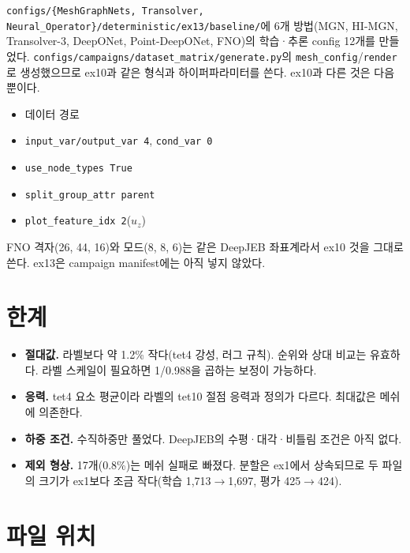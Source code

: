 \documentclass[11pt]{article}
\begin{document}
\texttt{configs/\{MeshGraphNets, Transolver, Neural\_Operator\}/deterministic/ex13/baseline/}에
6개 방법(MGN, HI-MGN, Transolver-3, DeepONet, Point-DeepONet, FNO)의 학습·추론
config 12개를 만들었다. \texttt{configs/campaigns/dataset\_matrix/generate.py}의
\texttt{mesh\_config}/\texttt{render}로 생성했으므로 ex10과 같은 형식과 하이퍼파라미터를
쓴다. ex10과 다른 것은 다음뿐이다.
\begin{itemize}
\item 데이터 경로
\item \texttt{input\_var/output\_var 4}, \texttt{cond\_var 0}
\item \texttt{use\_node\_types True}
\item \texttt{split\_group\_attr parent}
\item \texttt{plot\_feature\_idx 2}($u_z$)
\end{itemize}
FNO 격자(26, 44, 16)와 모드(8, 8, 6)는 같은 DeepJEB 좌표계라서 ex10 것을 그대로 쓴다.
ex13은 campaign manifest에는 아직 넣지 않았다.

\section{한계}

\begin{itemize}
\item \textbf{절대값.} 라벨보다 약 1.2\% 작다(tet4 강성, 러그 규칙). 순위와 상대 비교는 유효하다.
      라벨 스케일이 필요하면 1/0.988을 곱하는 보정이 가능하다.
\item \textbf{응력.} tet4 요소 평균이라 라벨의 tet10 절점 응력과 정의가 다르다. 최대값은
      메쉬에 의존한다.
\item \textbf{하중 조건.} 수직하중만 풀었다. DeepJEB의 수평·대각·비틀림 조건은 아직 없다.
\item \textbf{제외 형상.} 17개(0.8\%)는 메쉬 실패로 빠졌다. 분할은 ex1에서 상속되므로 두 파일의
      크기가 ex1보다 조금 작다(학습 1,713$\to$1,697, 평가 425$\to$424).
\end{itemize}

\appendix
\section{파일 위치}
\end{document}
